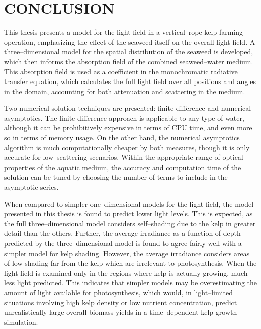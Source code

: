 \chapter{CONCLUSION}
\label{chap:conclusion}

This thesis presents a model for the light field in a vertical--rope kelp farming operation, emphasizing the effect of the seaweed itself on the overall light field.
A three--dimensional model for the spatial distribution of the seaweed is developed, which then informs the absorption field of the combined seaweed--water medium.
This absorption field is used as a coefficient in the monochromatic radiative transfer equation, which calculates the full light field over all positions and angles in the domain, accounting for both attenuation and scattering in the medium.

Two numerical solution techniques are presented: finite difference and numerical asymptotics.
The finite difference approach is applicable to any type of water, although it can be prohibitively expensive in terms of CPU time, and even more so in terms of memory usage.
On the other hand, the numerical asymptotics algorithm is much computationally cheaper by both measures, though it is only accurate for low--scattering scenarios.
Within the appropriate range of optical properties of the aquatic medium, the accuracy and computation time of the solution can be tuned by choosing the number of terms to include in the asymptotic series.

When compared to simpler one--dimensional models for the light field, the model presented in this thesis is found to predict lower light levels.
This is expected, as the full three--dimensional model considers self--shading due to the kelp in greater detail than the others.
Further, the average irradiance as a function of depth predicted by the three--dimensional model is found to agree fairly well with a simpler model for kelp shading.
However, the average irradiance considers areas of low shading far from the kelp which are irrelevant to photosynthesis.
When the light field is examined only in the regions where kelp is actually growing, much less light predicted.
This indicates that simpler models may be overestimating the amount of light available for photosynthesis, which would, in light--limited situations involving high kelp density or low nutrient concentration, predict unrealistically large overall biomass yields in a time--dependent kelp growth simulation.

